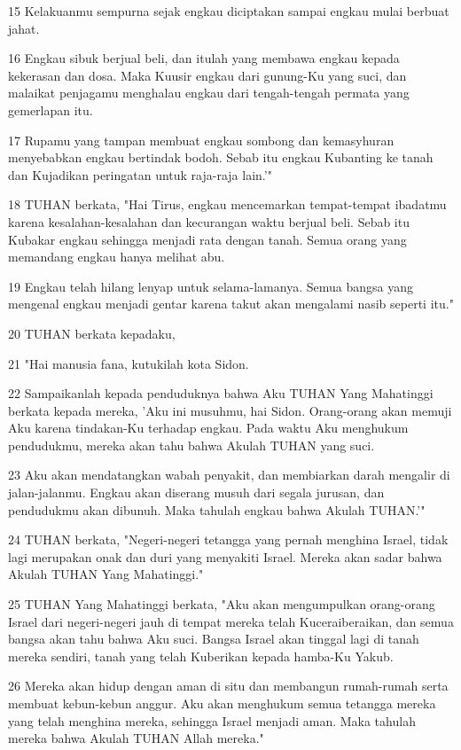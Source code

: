 \par 15 Kelakuanmu sempurna sejak engkau diciptakan sampai engkau mulai berbuat jahat.
\par 16 Engkau sibuk berjual beli, dan itulah yang membawa engkau kepada kekerasan dan dosa. Maka Kuusir engkau dari gunung-Ku yang suci, dan malaikat penjagamu menghalau engkau dari tengah-tengah permata yang gemerlapan itu.
\par 17 Rupamu yang tampan membuat engkau sombong dan kemasyhuran menyebabkan engkau bertindak bodoh. Sebab itu engkau Kubanting ke tanah dan Kujadikan peringatan untuk raja-raja lain.'"
\par 18 TUHAN berkata, "Hai Tirus, engkau mencemarkan tempat-tempat ibadatmu karena kesalahan-kesalahan dan kecurangan waktu berjual beli. Sebab itu Kubakar engkau sehingga menjadi rata dengan tanah. Semua orang yang memandang engkau hanya melihat abu.
\par 19 Engkau telah hilang lenyap untuk selama-lamanya. Semua bangsa yang mengenal engkau menjadi gentar karena takut akan mengalami nasib seperti itu."
\par 20 TUHAN berkata kepadaku,
\par 21 "Hai manusia fana, kutukilah kota Sidon.
\par 22 Sampaikanlah kepada penduduknya bahwa Aku TUHAN Yang Mahatinggi berkata kepada mereka, 'Aku ini musuhmu, hai Sidon. Orang-orang akan memuji Aku karena tindakan-Ku terhadap engkau. Pada waktu Aku menghukum pendudukmu, mereka akan tahu bahwa Akulah TUHAN yang suci.
\par 23 Aku akan mendatangkan wabah penyakit, dan membiarkan darah mengalir di jalan-jalanmu. Engkau akan diserang musuh dari segala jurusan, dan pendudukmu akan dibunuh. Maka tahulah engkau bahwa Akulah TUHAN.'"
\par 24 TUHAN berkata, "Negeri-negeri tetangga yang pernah menghina Israel, tidak lagi merupakan onak dan duri yang menyakiti Israel. Mereka akan sadar bahwa Akulah TUHAN Yang Mahatinggi."
\par 25 TUHAN Yang Mahatinggi berkata, "Aku akan mengumpulkan orang-orang Israel dari negeri-negeri jauh di tempat mereka telah Kuceraiberaikan, dan semua bangsa akan tahu bahwa Aku suci. Bangsa Israel akan tinggal lagi di tanah mereka sendiri, tanah yang telah Kuberikan kepada hamba-Ku Yakub.
\par 26 Mereka akan hidup dengan aman di situ dan membangun rumah-rumah serta membuat kebun-kebun anggur. Aku akan menghukum semua tetangga mereka yang telah menghina mereka, sehingga Israel menjadi aman. Maka tahulah mereka bahwa Akulah TUHAN Allah mereka."

